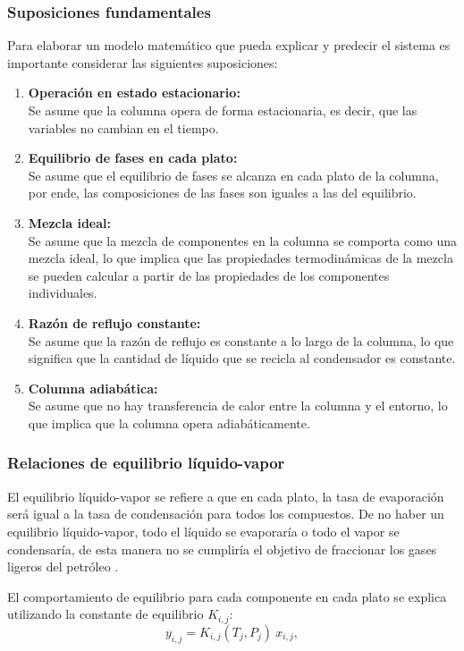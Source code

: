 \subsubsection{Suposiciones fundamentales}
Para elaborar un modelo matemático que pueda explicar y predecir el sistema es importante considerar las siguientes suposiciones:
\begin{enumerate}
    \item \textbf{Operación en estado estacionario:}\\
          Se asume que la columna opera de forma estacionaria, es decir, que las variables no cambian en el tiempo.
    \item \textbf{Equilibrio de fases en cada plato:}\\
          Se asume que el equilibrio de fases se alcanza en cada plato de la columna, por ende, las composiciones de las fases son iguales a las del equilibrio.
    \item \textbf{Mezcla ideal:}\\
          Se asume que la mezcla de componentes en la columna se comporta como una mezcla ideal, lo que implica que las propiedades termodinámicas de la mezcla se pueden calcular a partir de las propiedades de los componentes individuales.
    \item \textbf{Razón de reflujo constante:}\\
          Se asume que la razón de reflujo es constante a lo largo de la columna, lo que significa que la cantidad de líquido que se recicla al condensador es constante.
    \item \textbf{Columna adiabática:}\\
          Se asume que no hay transferencia de calor entre la columna y el entorno, lo que implica que la columna opera adiabáticamente.
\end{enumerate}

\newpage
\subsubsection{Relaciones de equilibrio líquido-vapor}
El equilibrio líquido-vapor se refiere a que en cada plato, la tasa de evaporación será igual a la tasa de condensación para todos los compuestos. De no haber un equilibrio líquido-vapor, todo el líquido se evaporaría o todo el vapor se condensaría, de esta manera no se cumpliría el objetivo de fraccionar los gases ligeros del petróleo \parencite{subsec5_5ref3}.

El comportamiento de equilibrio para cada componente en cada plato se explica utilizando la constante de equilibrio $K_{i,j}$:
$$
    y_{i,j} = K_{i,j}(T_j, P_j)\ x_{i,j},
$$

